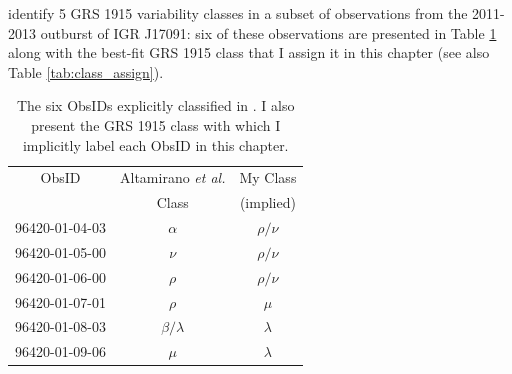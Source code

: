 \label{sec:Alta}
\par \citet{Altamirano_IGR_FH} identify 5 GRS 1915 variability classes in a subset of observations from the 2011-2013 outburst of IGR J17091: six of these observations are presented in Table \ref{tab:me_Diego} along with the best-fit GRS 1915 class that I assign it in this chapter (see also Table \ref{tab:class_assign}).

\begin{table}
\centering
\caption[The six ObsIDs explicitly classified in \citet{Altamirano_IGR_FH}.]{The six ObsIDs explicitly classified in \citet{Altamirano_IGR_FH}.  I also present the GRS 1915 class with which I implicitly label each ObsID in this chapter.}
\label{tab:me_Diego}
\begin{tabular}{ccc} %
\hline
\hline
ObsID & Altamirano \textit{et al.}& My Class\\
&Class&(implied)\\
\hline
96420-01-04-03&$\alpha$&$\rho/\nu$\\
96420-01-05-00&$\nu$&$\rho/\nu$\\
96420-01-06-00&$\rho$&$\rho/\nu$\\
96420-01-07-01&$\rho$&$\mu$\\
96420-01-08-03&$\beta/\lambda$&$\lambda$\\
96420-01-09-06&$\mu$&$\lambda$\\
\hline
\hline

\end{tabular}
\end{table}

